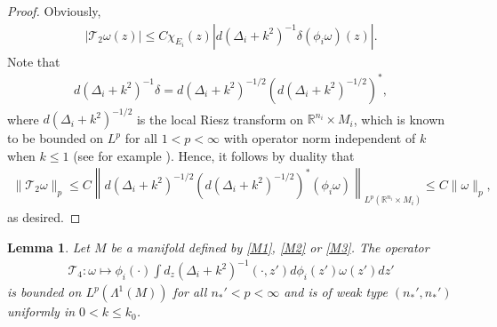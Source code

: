 \documentclass[12pt]{amsart}
\newtheorem{lemma}[theorem]{Lemma}
\begin{document}
\begin{proof}
Obviously,
\begin{align*}
    |\mathcal{T}_2\omega(z)| \le C \chi_{E_i}(z) |d(\Delta_i+k^2)^{-1}\delta (\phi_i \omega)(z)|.
\end{align*}
Note that
\begin{align*}
    d(\Delta_i+k^2)^{-1}\delta = d(\Delta_i +k^2)^{-1/2}\left(d(\Delta_i +k^2)^{-1/2}\right)^*,
\end{align*}
where $d(\Delta_i +k^2)^{-1/2}$ is the local Riesz transform on $\mathbb{R}^{n_i}\times M_i$, which is known to be bounded on $L^p$ for all $1<p<\infty$ with operator norm independent of $k$ when $k\le 1$ (see for example \cite{bak87}). Hence, it follows by duality that 
\begin{align*}
    \|\mathcal{T}_2\omega\|_p \le C \left\| d(\Delta_i +k^2)^{-1/2}\left(d(\Delta_i +k^2)^{-1/2}\right)^* (\phi_i\omega)\right\|_{L^p(\mathbb{R}^{n_i}\times M_i)} \le C \|\omega\|_p,
\end{align*}
as desired.
    
\end{proof}








\begin{lemma}\label{lemma_bad1}
Let $M$ be a manifold defined by \eqref{M1}, \eqref{M2} or \eqref{M3}. The operator
\begin{align*}
    \mathcal{T}_4: \omega \mapsto \phi_i(\cdot) \int d_z(\Delta_i+k^2)^{-1}(\cdot, z') d\phi_i(z') \omega(z') dz'
\end{align*}
is bounded on $L^p(\Lambda^1(M))$ for all $n_*'<p<\infty$ and is of weak type $(n_*', n_*')$ uniformly in $0<k\le k_0$.
\end{lemma}
\end{document}
